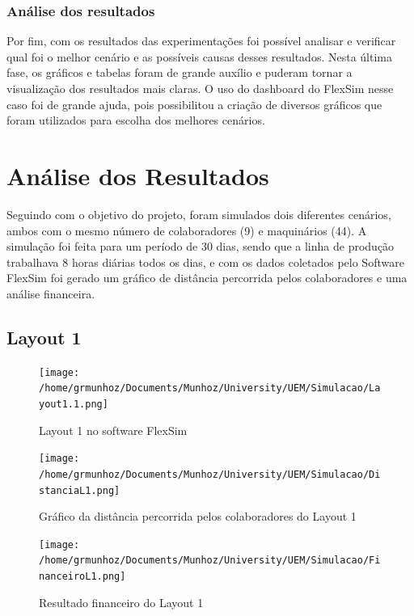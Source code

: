 \documentclass[
	12pt,				%
	openright,			%
	oneside,			%
	a4paper,			%
	english,			%
	french,				%
	spanish,			%
	brazil				%
	]{abntex2}
\begin{document}
\subsection{Análise dos resultados}

Por fim, com os resultados das experimentações foi possível analisar e verificar qual foi o melhor cenário e as possíveis causas desses resultados. Nesta última fase, os gráficos e tabelas foram de grande auxílio e puderam tornar a visualização dos resultados mais claras. O uso do dashboard do FlexSim nesse caso foi de grande ajuda, pois possibilitou a criação de diversos gráficos que foram utilizados para escolha dos melhores cenários.

\chapter{Análise dos Resultados}

Seguindo com o objetivo do projeto, foram simulados dois diferentes cenários, ambos com o mesmo número de colaboradores (9) e maquinários (44). A simulação foi feita para um período de 30 dias, sendo que a linha de produção trabalhava 8 horas diárias todos os dias, e com os dados coletados pelo Software FlexSim foi gerado um gráfico de distância percorrida pelos colaboradores e uma análise financeira.


\section*{Layout 1}

\begin{figure}[H]
\begin{center}
\caption{Layout 1 no software FlexSim}
\texttt{[image: /home/grmunhoz/Documents/Munhoz/University/UEM/Simulacao/Layout1.1.png]} 
\end{center}
\end{figure}

\begin{figure}[H]
\begin{center}
\caption{Gráfico da distância percorrida pelos colaboradores do Layout 1}
\texttt{[image: /home/grmunhoz/Documents/Munhoz/University/UEM/Simulacao/DistanciaL1.png]} 
\end{center}
\end{figure}

\begin{figure}[H]
\begin{center}
\caption{Resultado financeiro do Layout 1}
\texttt{[image: /home/grmunhoz/Documents/Munhoz/University/UEM/Simulacao/FinanceiroL1.png]} 
\end{center}
\end{figure}
\end{document}
